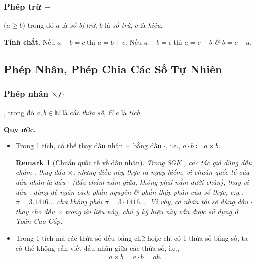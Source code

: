 \documentclass{article}
\numberwithin{equation}{section}
\newtheorem{remark}{Remark}[section]
\begin{document}
\subsubsection{Phép trừ $-$}
 ($a\ge b$) trong đó $a$ là \textit{số bị trừ}, $b$ là \textit{số trừ}, $c$ là \textit{hiệu}.

\noindent\textbf{Tính chất.} Nếu $a - b = c$ thì $a = b + c$. Nếu $a + b = c$ thì $a = c - b$ \textit{\&} $b = c - a$.

\subsection{Phép Nhân, Phép Chia Các Số Tự Nhiên}

\subsubsection{Phép nhân $\times$\texttt{/}$\cdot$}
, trong đó $a,b\in\mathbb{N}$ là các \textit{thừa số}, \textit{\&} $c$ là \textit{tích}.

\noindent\textbf{Quy ước.}
\begin{itemize}
	\item Trong 1 tích, có thể thay dấu nhân $\times$ bằng dấu $\cdot$, i.e., $a\cdot b\coloneqq a\times b$.
	
	\begin{remark}[Chuẩn quốc tế về dấu nhân]
		Trong SGK \cite[p. 18]{Thai_Anh_Dat_Ha_Loan_Nam_Quang_Toan_6_tap_1}, các tác giả dùng dấu chấm $.$ thay dấu $\times$, nhưng điều này thực ra nguy hiểm, vì chuẩn quốc tế của dấu nhân là dấu $\cdot$ (dấu chấm nằm giữa, không phải nằm dưới chân), thay vì dấu $.$ dùng để ngăn cách phần nguyên \textit{\&} phần thập phân của số thực, e.g., $\pi = 3.1416\ldots$ chứ không phải $\pi = 3\cdot 1416\ldots$. Vì vậy, cá nhân tôi sẽ dùng dấu $\cdot$ thay cho dấu $\times$ trong tài liệu này, chú ý ký hiệu này vẫn được sử dụng ở Toán Cao Cấp.
	\end{remark}
	\item Trong 1 tích mà các thừa số đều bằng chữ hoặc chỉ có 1 thừa số bằng số, ta có thể không cần viết dấu nhân giữa các thừa số, i.e.,
	\begin{align*}
		a\times b = a\cdot b = ab.
	\end{align*}
\end{itemize}
\end{document}
